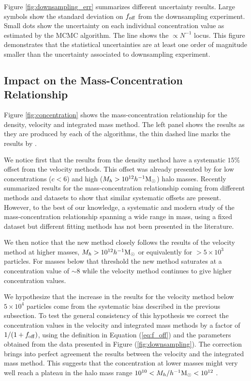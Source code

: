 \documentclass{emulateapj}
\newcommand{\hMsun}{{\ifmmode{h^{-1}{\rm {M_{\odot}}}}\else{$h^{-1}{\rm{M_{\odot}}}$}\fi}}
\begin{document}
Figure \ref{fig:downsampling_err} summarizes different uncertainty
results.  
Large symbols show the standard deviation on $f_{\rm off}$ from the
downsampling experiment.  
Small dots show the uncertainty on each individual concentration value
as estimated by the MCMC algorithm. 
The line shows the $\propto N^{-1}$ locus.  
This figure demonstrates that the statistical uncertainties are at
least one order of magnitude smaller than the uncertainty associated
to downsampling experiment. 


 
\subsection{Impact on the Mass-Concentration Relationship}


Figure \ref{fig:concentration} shows the mass-concentration
relationship for the density, velocity and integrated mass method.
The left panel shows the results as they are produced by each of the
algorithms, the thin dashed line marks the results by
\citep{Prada2012}.

We notice first that the results from the density method have a
systematic $15\%$offset from the velocity methods.  
This offset was already presented by \citep{Prada2012} for low
concentrations ($c<6$) and high ($M_h>10^{12}\hMsun$) halo masses.  
Recently \citep{Klypin2016} summarized results for the
mass-concentration relationship coming from different methods and
datasets to show that similar systematic offsets are present.
However, to the best of our knowledge, a systematic and modern study of
the mass-concentration relationship spanning a wide range in mass,
using a fixed dataset but different fitting methods has not been
presented in the literature.

We then notice that the new method closely follows the results of
the velocity method at higher masses, $M_h>10^{12}\hMsun$ or
equivalently for $>5\times10^3$ particles.  
For masses below that threshold the new method saturates at a
concentration value of $\sim 8$ while the velocity method continues to
give higher concentration values. 

We hypothesize that the increase in the results for the velocity
method below $5\times 10^{4}$ particles come from the systematic bias
described in the previous subsection.  To test the general consistency
of this hypothesis we correct the concentration values in the
velocity and integrated mass methods by a factor of $1/(1+f_{\rm
  off})$, using the definition in Equation (\ref{eq:f_off}) and the 
parameters obtained from the data presented in Figure
(\ref{fig:downsampling}).  
The correction brings into perfect agreement the results between the
velocity and the integrated mass method.  
This suggests that the concentration at lower masses might very well
reach a plateau in the halo mass range $10^{10}< M_{h}/\hMsun <
10^{12}$ . 
\end{document}
